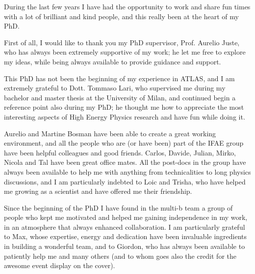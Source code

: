 \par\bigskip  
\par\bigskip

During the last few years I have had the opportunity to work and share fun times with a lot 
of brilliant and kind people, and this really been at the heart of my PhD. 

\par\medskip 

First of all, I would like to thank you my PhD supervisor, Prof. Aurelio Juste, who has always been 
extremely supportive of my work; 
he let me free to explore my ideas, while being always available to provide guidance and support. 

\par\medskip 

This PhD has not been the beginning of my experience in ATLAS, and I am extremely grateful to 
Dott. Tommaso Lari, who supervised me during my bachelor and master thesis at the University of Milan, 
and continued begin a reference point also during my PhD; 
he thought me how to appreciate the most interesting aspects of High Energy Physics research 
and have fun while doing it.  

\par\medskip 
 
Aurelio and Martine Bosman have been able to create a great working environment, and 
all the people who are (or have been) part of the IFAE group have been helpful colleagues and 
good friends.  
Carlos, Davide, Julian, Mirko, Nicola and Tal have been great office mates.  
All the post-docs in the group have always been available to help me with 
anything from technicalities to long physics discussions, 
and I am particularly indebted to Loic and Trisha, who have helped me growing as a scientist and have offered me 
their friendship. %

\par\medskip

Since the beginning of the PhD I have found in the multi-b team a 
group of people who kept me motivated and helped me 
gaining independence in my work, 
in an atmosphere that always enhanced collaboration.%
I am particularly grateful to Max, whose expertise, energy and dedication have been 
invaluable ingredients in building a wonderful team, 
and to Giordon, who has always been available to patiently help me and many others (and 
to whom goes also the credit for the awesome event display on the cover). 

